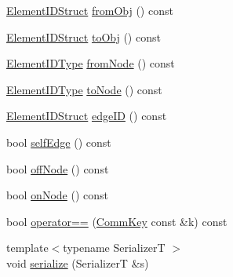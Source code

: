 \begin{DoxyCompactItemize}
\item 
\hyperlink{structvt_1_1elm_1_1_element_i_d_struct}{Element\+I\+D\+Struct} \hyperlink{structvt_1_1elm_1_1_comm_key_a75f1afcaf2349cdc7de7bf8586ba8832}{from\+Obj} () const
\item 
\hyperlink{structvt_1_1elm_1_1_element_i_d_struct}{Element\+I\+D\+Struct} \hyperlink{structvt_1_1elm_1_1_comm_key_a4dd567c04eea5bb8aeb2acd7ad8f01de}{to\+Obj} () const
\item 
\hyperlink{namespacevt_1_1elm_a63afb64985b41b7b6dcf2f01336391f8}{Element\+I\+D\+Type} \hyperlink{structvt_1_1elm_1_1_comm_key_a0ca4110f2eec16b09cbb1201c3e094e6}{from\+Node} () const
\item 
\hyperlink{namespacevt_1_1elm_a63afb64985b41b7b6dcf2f01336391f8}{Element\+I\+D\+Type} \hyperlink{structvt_1_1elm_1_1_comm_key_a049276643e77cfea00a68e5dcaa87eb2}{to\+Node} () const
\item 
\hyperlink{structvt_1_1elm_1_1_element_i_d_struct}{Element\+I\+D\+Struct} \hyperlink{structvt_1_1elm_1_1_comm_key_a23b4e6a59e39eac8a5e631496e6cd618}{edge\+ID} () const
\item 
bool \hyperlink{structvt_1_1elm_1_1_comm_key_afbe1b9e740b507000addc28a4f5245df}{self\+Edge} () const
\item 
bool \hyperlink{structvt_1_1elm_1_1_comm_key_a52b50e35388e05418d9288ee3233659e}{off\+Node} () const
\item 
bool \hyperlink{structvt_1_1elm_1_1_comm_key_a3f8677b9b9107edd7b6dd3412a89143e}{on\+Node} () const
\item 
bool \hyperlink{structvt_1_1elm_1_1_comm_key_afe0d2056b16820eb721fd282eeb53f73}{operator==} (\hyperlink{structvt_1_1elm_1_1_comm_key}{Comm\+Key} const \&k) const
\item 
{\footnotesize template$<$typename SerializerT $>$ }\\void \hyperlink{structvt_1_1elm_1_1_comm_key_a7fe80a1dba0e87be03df137c7cb246ac}{serialize} (SerializerT \&s)
\end{DoxyCompactItemize}
